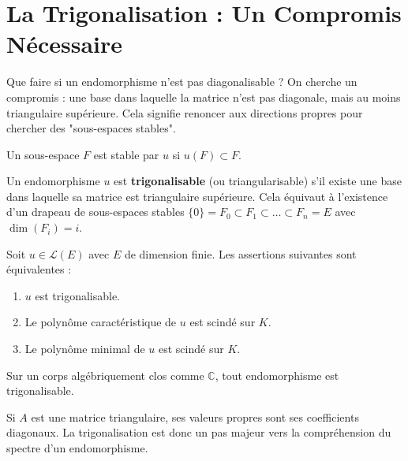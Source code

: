 \section{La Trigonalisation : Un Compromis Nécessaire}

\begin{objectif}
    Que faire si un endomorphisme n'est pas diagonalisable ? On cherche un compromis : une base dans laquelle la matrice n'est pas diagonale, mais au moins triangulaire supérieure. Cela signifie renoncer aux directions propres pour chercher des "sous-espaces stables".
\end{objectif}

\begin{definition}
    Un sous-espace $F$ est stable par $u$ si $u(F) \subset F$.
\end{definition}

\begin{proposition}
    Un endomorphisme $u$ est \textbf{trigonalisable} (ou triangularisable) s'il existe une base dans laquelle sa matrice est triangulaire supérieure. Cela équivaut à l'existence d'un drapeau de sous-espaces stables $\{0\} = F_0 \subset F_1 \subset \dots \subset F_n = E$ avec $\dim(F_i)=i$.
\end{proposition}

\begin{theorem}
    Soit $u \in \mathcal{L}(E)$ avec $E$ de dimension finie. Les assertions suivantes sont équivalentes :
    \begin{enumerate}
        \item $u$ est trigonalisable.
        \item Le polynôme caractéristique de $u$ est scindé sur $K$.
        \item Le polynôme minimal de $u$ est scindé sur $K$.
    \end{enumerate}
\end{theorem}

\begin{corollary}
    Sur un corps algébriquement clos comme $\mathbb{C}$, tout endomorphisme est trigonalisable.
\end{corollary}

\begin{application}
    Si $A$ est une matrice triangulaire, ses valeurs propres sont ses coefficients diagonaux. La trigonalisation est donc un pas majeur vers la compréhension du spectre d'un endomorphisme.
\end{application}

